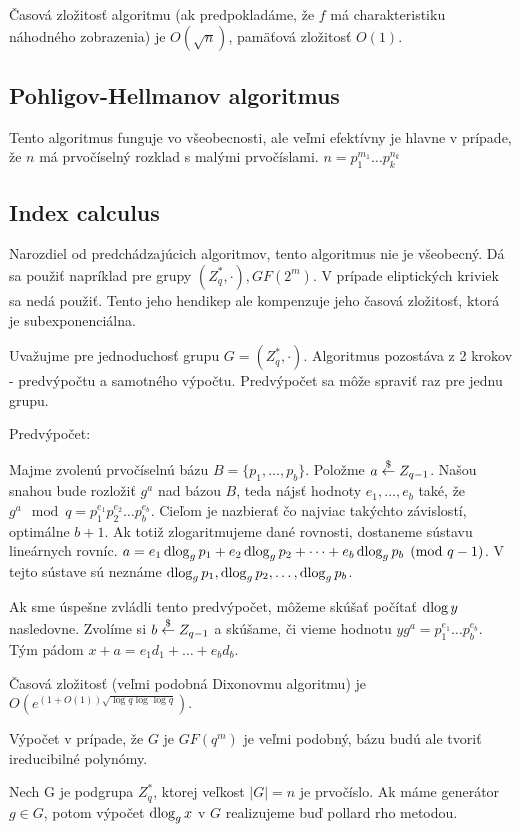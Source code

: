 Časová zložitosť algoritmu (ak predpokladáme,
že $f$ má charakteristiku náhodného zobrazenia) je
$O(\sqrt{n})$, pamäťová zložitosť $O(1)$.

\subsection{Pohligov-Hellmanov algoritmus}
Tento algoritmus funguje vo všeobecnosti, ale veľmi efektívny je hlavne v
prípade, že $n$ má prvočíselný rozklad s malými prvočíslami.
$n=p_1^{m_1} \dots p_k^{n_k}$



\subsection{Index calculus}
Narozdiel od predchádzajúcich algoritmov, tento algoritmus nie je
všeobecný. Dá sa použiť napríklad pre grupy $(Z_q^*,\cdot), GF(2^m)$.
V prípade eliptických kriviek sa nedá použiť. Tento jeho hendikep
ale kompenzuje jeho časová zložitosť, ktorá je subexponenciálna.

Uvažujme pre jednoduchosť grupu $G=(Z_q^*,\cdot)$.
Algoritmus pozostáva z 2 krokov - predvýpočtu a samotného výpočtu.
Predvýpočet sa môže spraviť raz pre jednu grupu.

Predvýpočet:

Majme zvolenú prvočíselnú bázu $B=\{p_1,\dots,p_b\}$.
Položme $a \overset{\$}{\leftarrow} Z_{q-1}$. 
Našou snahou bude rozložiť $g^a$ nad bázou $B$, teda nájsť hodnoty
$e_1,\dots,e_b$ také, že $g^a \mod q = p_1^{e_1} p_2^{e_2} \dots
p_b^{e_b}$.
Cieľom je nazbierať čo najviac takýchto závislostí, optimálne
$b+1$. Ak totiž zlogaritmujeme dané rovnosti, dostaneme sústavu
lineárnych rovníc.
$a=e_1 \operatorname{dlog}_g p_1 + e_2 \operatorname{dlog}_g p_2 + \dots + e_b \operatorname{dlog}_g p_b \pmod{q-1}$.
V tejto sústave sú neznáme $\operatorname{dlog}_g p_1, \operatorname{dlog}_g p_2, \dots, \operatorname{dlog}_g p_b$.

Ak sme úspešne zvládli tento predvýpočet, môžeme skúšať počítať $\operatorname{dlog} y$
nasledovne.
Zvolíme si $b\overset{\$}{\leftarrow} Z_{q-1}$ a skúšame, či vieme hodnotu
$y g^a = p_1 ^ {e_1} \dots p_b ^ {e_b}$. Tým pádom
$x+a = e_1 d_1 + \dots + e_b d_b$.

Časová zložitosť (veľmi podobná Dixonovmu algoritmu) je
$O(e^{(1+O(1))\sqrt{\log q \log \log q}})$.

\begin{poznamka}
    Výpočet v prípade, že $G$ je $GF(q^m)$ je veľmi podobný, bázu budú ale
    tvoriť ireducibilné polynómy.
\end{poznamka}
\begin{poznamka}
    Nech G je podgrupa $Z_q^*$, ktorej veľkost $|G|=n$ je prvočíslo.
    Ak máme generátor $g\in G$, potom výpočet $\operatorname{dlog}_g x$ v $G$ 
    realizujeme buď pollard rho metodou.
\end{poznamka}
